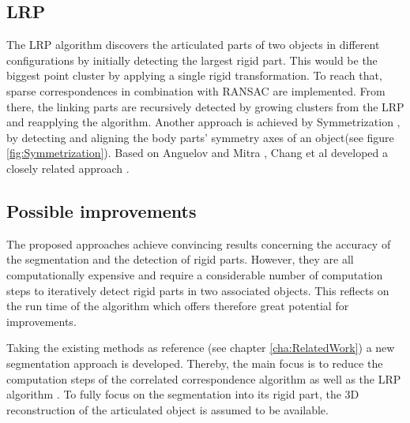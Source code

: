 \subsection{LRP}
The LRP algorithm discovers the articulated parts of two objects in different configurations by initially detecting the largest rigid part. This would be the biggest point cluster by applying a single rigid transformation. To reach that, sparse correspondences in combination with RANSAC are implemented. From there, the linking parts are recursively detected by growing clusters from the LRP and reapplying the algorithm. 
Another approach is achieved by Symmetrization \cite{Mitra07}, by detecting and aligning the body parts’ symmetry axes of an object(see figure \ref{fig:Symmetrization}). Based on Anguelov \cite{Anguelov04} and Mitra \cite{Mitra07}, Chang et al developed a closely related approach \cite{chang08articulated} \cite{chang09range}.

\subsection{Possible improvements}


The proposed approaches achieve convincing results concerning the accuracy of the segmentation and the detection of rigid parts. However, they are all computationally expensive and require a considerable number of computation steps to iteratively detect rigid parts in two associated objects. This reflects on the run time of the algorithm which offers therefore great potential for improvements.

Taking the existing methods as reference (see chapter \ref{cha:RelatedWork}) a new segmentation approach is developed. Thereby, the main focus is to reduce the computation steps of the correlated correspondence algorithm \cite{CorrelatedCorrespondance} as well as the LRP algorithm \cite {guo2016correspondence}. To fully focus on the segmentation into its rigid part, the 3D reconstruction of the articulated object is assumed to be available.